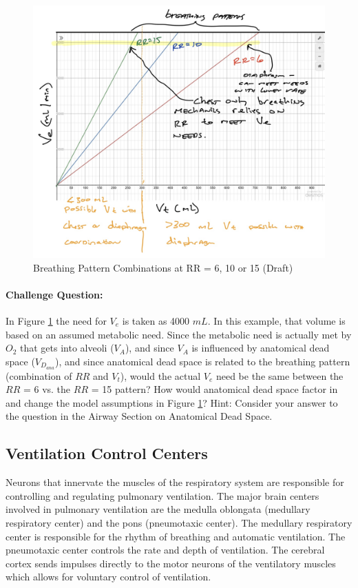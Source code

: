 \begin{figure}
    \centering
    \includegraphics[width=1.0 \linewidth]{./figure/ventilation/breathing_patterns.jpg}
    \caption{Breathing Pattern Combinations at RR = 6, 10 or 15 (Draft)}
    \label{fig:breathing_patterns}
\end{figure}

\paragraph{Challenge Question:} In Figure \ref{fig:breathing_patterns} the need for $V_e$ is taken as 4000 $mL$. In this example, that volume is based on an assumed metabolic need. Since the metabolic need is actually met by $O_2$ that gets into alveoli ($V_A$), and since $V_A$ is influenced by anatomical dead space ($V_D_{ana}$), and since anatomical dead space is related to the breathing pattern (combination of $RR$ and $V_t$), would the actual $V_e$ need be the same between the $RR$ = 6 vs. the $RR$ = 15 pattern? How would anatomical dead space factor in and change the model assumptions in Figure \ref{fig:breathing_patterns}? Hint: Consider your answer to the question in the Airway Section on Anatomical Dead Space.


\subsection{Ventilation Control Centers}

Neurons that innervate the muscles of the respiratory system are responsible for controlling and regulating pulmonary ventilation. The major brain centers involved in pulmonary ventilation are the medulla oblongata (medullary respiratory center) and the pons (pneumotaxic center). The medullary respiratory center is responsible for the rhythm of breathing and automatic ventilation. The pneumotaxic center controls the rate and depth of ventilation. The cerebral cortex sends impulses directly to the motor neurons of the ventilatory muscles which allows for voluntary control of ventilation.

